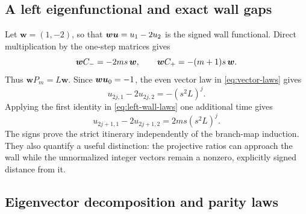 \documentclass[11pt]{article}
\theoremstyle{definition}
\theoremstyle{remark}
\begin{document}
\subsection{A left eigenfunctional and exact wall gaps}

Let \(\boldsymbol{w}=(1,-2)\), so that \(\boldsymbol{w}\boldsymbol{u}=u_1-2u_2\)
is the signed wall functional.  Direct multiplication by the one-step
matrices gives
\begin{equation}
\boldsymbol{w}C_{-}=-2ms\,\boldsymbol{w},
\qquad
\boldsymbol{w}C_{+}=-(m+1)s\,\boldsymbol{w}.
\label{eq:left-wall-laws}
\end{equation}
Thus \(\boldsymbol{w}P_m=L\boldsymbol{w}\).  Since
\(\boldsymbol{w}\boldsymbol{u}_0=-1\), the even vector law in
\eqref{eq:vector-laws} gives
\begin{equation}
u_{2j,1}-2u_{2j,2}=-(s^2L)^j.
\label{eq:even-wall-gap}
\end{equation}
Applying the first identity in \eqref{eq:left-wall-laws} one additional time
gives
\begin{equation}
u_{2j+1,1}-2u_{2j+1,2}=2ms(s^2L)^j.
\label{eq:odd-wall-gap}
\end{equation}
The signs prove the strict itinerary independently of the branch-map
induction.  They also quantify a useful distinction: the projective ratios
can approach the wall while the unnormalized integer vectors remain a
nonzero, explicitly signed distance from it.

\subsection{Eigenvector decomposition and parity laws}
\end{document}
